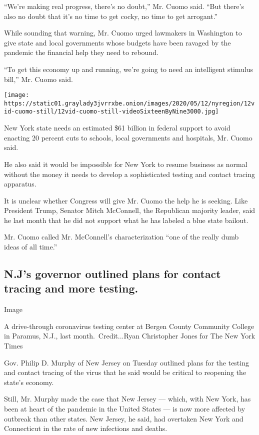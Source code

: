 ``We're making real progress, there's no doubt,'' Mr. Cuomo said. ``But
there's also no doubt that it's no time to get cocky, no time to get
arrogant.''

While sounding that warning, Mr. Cuomo urged lawmakers in Washington to
give state and local governments whose budgets have been ravaged by the
pandemic the financial help they need to rebound.

``To get this economy up and running, we're going to need an intelligent
stimulus bill,'' Mr. Cuomo said.

\texttt{[image: https://static01.graylady3jvrrxbe.onion/images/2020/05/12/nyregion/12vid-cuomo-still/12vid-cuomo-still-videoSixteenByNine3000.jpg]}

New York state needs an estimated \$61 billion in federal support to
avoid enacting 20 percent cuts to schools, local governments and
hospitals, Mr. Cuomo said.

He also said it would be impossible for New York to resume business as
normal without the money it needs to develop a sophisticated testing and
contact tracing apparatus.

It is unclear whether Congress will give Mr. Cuomo the help he is
seeking. Like President Trump, Senator Mitch McConnell, the Republican
majority leader, said he last month that he did not support what he has
labeled a blue state bailout.

Mr. Cuomo called Mr. McConnell's characterization ``one of the really
dumb ideas of all time.''

\hypertarget{njs-governor-outlined-plans-for-contact-tracing-and-more-testing}{%
\subsection{N.J's governor outlined plans for contact tracing and more
testing.}\label{njs-governor-outlined-plans-for-contact-tracing-and-more-testing}}

Image

A drive-through coronavirus testing center at Bergen County Community
College in Paramus, N.J., last month.~Credit...Ryan Christopher Jones
for The New York Times

Gov. Philip D. Murphy of New Jersey on Tuesday outlined plans for the
testing and contact tracing of the virus that he said would be critical
to reopening the state's economy.

Still, Mr. Murphy made the case that New Jersey --- which, with New
York, has been at heart of the pandemic in the United States --- is now
more affected by outbreak than other states. New Jersey, he said, had
overtaken New York and Connecticut in the rate of new infections and
deaths.

